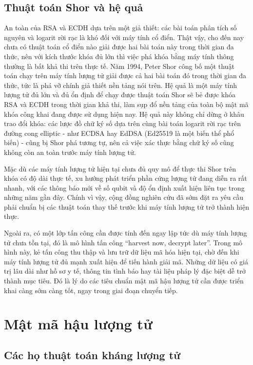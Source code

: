 \subsection{Thuật toán Shor và hệ quả}

An toàn của RSA và ECDH dựa trên một giả thiết: các bài toán phân tích số nguyên và logarit rời rạc là khó đối với máy tính cổ điển. Thật vậy, cho đến nay chưa có thuật toán cổ điển nào giải được hai bài toán này trong thời gian đa thức, nên với kích thước khóa đủ lớn thì việc phá khóa bằng máy tính thông thường là bất khả thi trên thực tế. Năm 1994, Peter Shor công bố một thuật toán chạy trên máy tính lượng tử giải được cả hai bài toán đó trong thời gian đa thức, tức là phá vỡ chính giả thiết nền tảng nói trên. Hệ quả là một máy tính lượng tử đủ lớn và đủ ổn định để chạy được thuật toán Shor sẽ bẻ được khóa RSA và ECDH trong thời gian khả thi, làm sụp đổ nền tảng của toàn bộ mật mã khóa công khai đang được sử dụng hiện nay. Hệ quả này không chỉ dừng ở khâu trao đổi khóa: các lược đồ chữ ký số dựa trên cùng bài toán logarit rời rạc trên đường cong elliptic - như ECDSA hay EdDSA (Ed25519 là một biến thể phổ biến) - cũng bị Shor phá tương tự, nên cả việc xác thực bằng chữ ký số cũng không còn an toàn trước máy tính lượng tử.

Mặc dù các máy tính lượng tử hiện tại chưa đủ quy mô để thực thi Shor trên khóa có độ dài thực tế, xu hướng phát triển phần cứng lượng tử đang diễn ra rất nhanh, với các thông báo mới về số qubit và độ ổn định xuất hiện liên tục trong những năm gần đây. Chính vì vậy, cộng đồng nghiên cứu đã sớm đặt ra yêu cầu phải chuẩn bị các thuật toán thay thế trước khi máy tính lượng tử trở thành hiện thực.

Ngoài ra, có một lớp tấn công cần được tính đến ngay lập tức dù máy tính lượng tử chưa tồn tại, đó là mô hình tấn công “harvest now, decrypt later”. Trong mô hình này, kẻ tấn công thu thập và lưu trữ dữ liệu mã hóa hiện tại, chờ đến khi máy tính lượng tử đủ mạnh xuất hiện để tiến hành giải mã. Những dữ liệu có giá trị lâu dài như hồ sơ y tế, thông tin tình báo hay tài liệu pháp lý đặc biệt dễ trở thành mục tiêu. Đó là lý do các tiêu chuẩn mật mã hậu lượng tử cần được triển khai càng sớm càng tốt, ngay trong giai đoạn chuyển tiếp.

\section{Mật mã hậu lượng tử}


\subsection{Các họ thuật toán kháng lượng tử}

